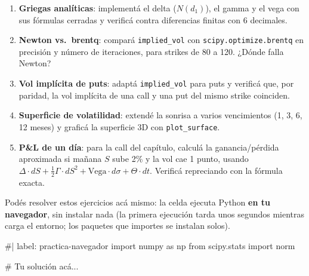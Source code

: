 \documentclass[
  spanish,
  letterpaper,
  DIV=11,
  numbers=noendperiod]{scrreprt}
\newenvironment{Shaded}{\begin{snugshade}}{\end{snugshade}}
\newcommand{\NormalTok}[1]{\textcolor[rgb]{0.00,0.23,0.31}{#1}}
\providecommand{\tightlist}{%
  \setlength{\itemsep}{0pt}\setlength{\parskip}{0pt}}
\begin{document}
\begin{tcolorbox}[enhanced jigsaw, bottomrule=.15mm, colback=white, opacitybacktitle=0.6, arc=.35mm, toprule=.15mm, opacityback=0, breakable, titlerule=0mm, left=2mm, coltitle=black, colbacktitle=quarto-callout-important-color!10!white, colframe=quarto-callout-important-color-frame, leftrule=.75mm, toptitle=1mm, bottomtitle=1mm, title=\textcolor{quarto-callout-important-color}{\faExclamation}\hspace{0.5em}{Ejercicios}, rightrule=.15mm]

\begin{enumerate}
\def\labelenumi{\arabic{enumi}.}
\tightlist
\item
  \textbf{Griegas analíticas}: implementá el delta (\(N(d_1)\)), el
  gamma y el vega con sus fórmulas cerradas y verificá contra
  diferencias finitas con 6 decimales.
\item
  \textbf{Newton vs.~brentq}: compará \texttt{implied\_vol} con
  \texttt{scipy.optimize.brentq} en precisión y número de iteraciones,
  para strikes de 80 a 120. ¿Dónde falla Newton?
\item
  \textbf{Vol implícita de puts}: adaptá \texttt{implied\_vol} para puts
  y verificá que, por paridad, la vol implícita de una call y una put
  del mismo strike coinciden.
\item
  \textbf{Superficie de volatilidad}: extendé la sonrisa a varios
  vencimientos (1, 3, 6, 12 meses) y graficá la superficie 3D con
  \texttt{plot\_surface}.
\item
  \textbf{P\&L de un día}: para la call del capítulo, calculá la
  ganancia/pérdida aproximada si mañana \(S\) sube 2\% y la vol cae 1
  punto, usando
  \(\Delta \cdot dS + \frac{1}{2}\Gamma \cdot dS^2 + \text{Vega} \cdot d\sigma + \Theta \cdot dt\).
  Verificá repreciando con la fórmula exacta.
\end{enumerate}

\end{tcolorbox}

Podés resolver estos ejercicios acá mismo: la celda ejecuta Python
\textbf{en tu navegador}, sin instalar nada (la primera ejecución tarda
unos segundos mientras carga el entorno; los paquetes que importes se
instalan solos).

\begin{Shaded}
\begin{Highlighting}[]
\NormalTok{\#| label: practica{-}navegador}
\NormalTok{import numpy as np}
\NormalTok{from scipy.stats import norm}

\NormalTok{\# Tu solución acá...}
\end{Highlighting}
\end{Shaded}
\end{document}
